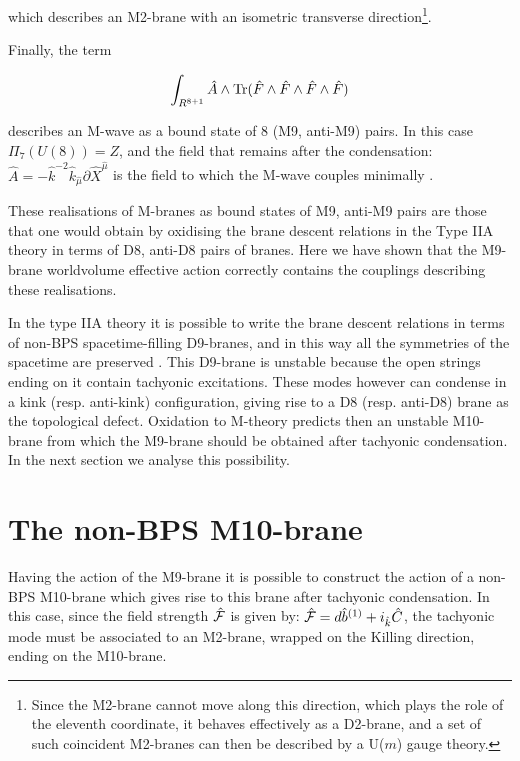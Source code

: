 \documentclass[12pt,a4paper]{article}
\begin{document}
\noindent which describes an M2-brane with an isometric transverse
direction\footnote{Since the M2-brane cannot move along this direction,
which plays the role of the eleventh coordinate,
it behaves effectively as a D2-brane, and a set of such coincident
M2-branes can then be described by a U($m$) gauge theory.}.

Finally, the term

\begin{equation}
\int_{R^{8+1}}{\hat A}\wedge {\rm Tr}({\hat F}\wedge {\hat F}\wedge
{\hat F}\wedge {\hat F})
\end{equation}

\noindent describes an M-wave as a bound state of 8 (M9, anti-M9) pairs.
In this case $\Pi_7(U(8))=Z$, and the field that remains after the
condensation:
${\hat A}=-{\hat k}^{-2}{\hat k}_{\hat \mu}\partial {\hat X}^{\hat \mu}$
is the field to which the M-wave couples minimally \cite{BT}.

These realisations of M-branes as bound states of M9, anti-M9 pairs 
are those that one would obtain by oxidising the 
brane descent relations in the Type IIA theory in terms of D8, 
anti-D8 pairs of branes. Here we have
shown that the M9-brane worldvolume effective action correctly contains
the couplings describing these realisations.
 
In the type IIA theory it is possible to write the brane descent
relations in terms of non-BPS spacetime-filling D9-branes, and in this
way all the symmetries of the spacetime are preserved \cite{Horava}.
This D9-brane is unstable because the open strings ending on it
contain tachyonic excitations. These modes however can condense in a 
kink (resp. anti-kink) configuration, giving rise to a D8 (resp. anti-D8) 
brane as the topological
defect. Oxidation to M-theory predicts then an unstable M10-brane
from which the M9-brane should be obtained after tachyonic 
condensation. In the next
section we analyse this possibility.

\section{The non-BPS M10-brane}


Having the action of the M9-brane it is
possible to construct the action of a non-BPS M10-brane which gives rise
to this brane after tachyonic condensation. In this case, since the
field strength ${\hat {\cal F}}$ is given by: ${\hat {\cal F}}=d{\hat b}^{(1)}+
i_{\hat k}{\hat C}$, the tachyonic mode must be associated to an 
M2-brane, wrapped
on the Killing direction, ending on the M10-brane. 
\end{document}

